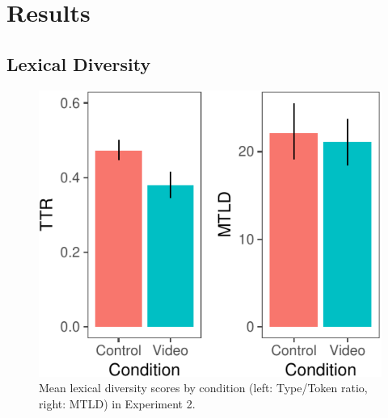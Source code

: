 \documentclass[10pt, letterpaper]{article}
\newenvironment{CodeChunk}{}{}
\begin{document}
\section{Results}\label{results-1}

\subsection{Lexical Diversity}\label{lexical-diversity-1}

\begin{CodeChunk}
\begin{figure}[H]

{\centering \includegraphics{figs/e2lexdiv-1} 

}

\caption[Mean lexical diversity scores by condition (left]{Mean lexical diversity scores by condition (left: Type/Token ratio, right: MTLD) in Experiment 2.}\label{fig:e2lexdiv}
\end{figure}
\end{CodeChunk}
\end{document}
